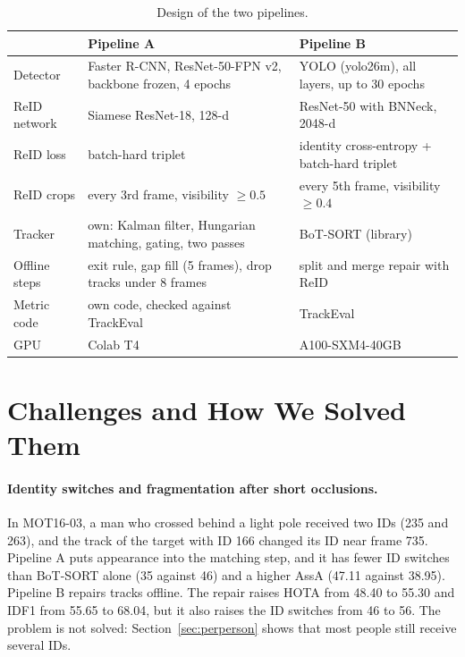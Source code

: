 \documentclass[11pt,letterpaper]{article}
\begin{document}
\begin{table}[h]
\centering\small
\caption{Design of the two pipelines.}\label{tab:design}
\begin{tabular}{p{2.6cm}p{6.1cm}p{6.1cm}}
\toprule
 & Pipeline A & Pipeline B \\
\midrule
Detector & Faster R-CNN, ResNet-50-FPN v2, backbone frozen, 4 epochs & YOLO (yolo26m), all layers, up to 30 epochs \\
ReID network & Siamese ResNet-18, 128-d & ResNet-50 with BNNeck, 2048-d \\
ReID loss & batch-hard triplet & identity cross-entropy + batch-hard triplet \\
ReID crops & every 3rd frame, visibility $\geq 0.5$ & every 5th frame, visibility $\geq 0.4$ \\
Tracker & own: Kalman filter, Hungarian matching, gating, two passes & BoT-SORT (library) \\
Offline steps & exit rule, gap fill (5 frames), drop tracks under 8 frames & split and merge repair with ReID \\
Metric code & own code, checked against TrackEval & TrackEval \\
GPU & Colab T4 & A100-SXM4-40GB \\
\bottomrule
\end{tabular}
\end{table}

\section{Challenges and How We Solved Them}\label{sec:challenges}

\paragraph{Identity switches and fragmentation after short occlusions.}
In MOT16-03, a man who crossed behind a light pole received two IDs (235 and 263), and the track of the target with ID 166 changed its ID near frame 735.
Pipeline A puts appearance into the matching step, and it has fewer ID switches than BoT-SORT alone (35 against 46) and a higher AssA (47.11 against 38.95).
Pipeline B repairs tracks offline.
The repair raises HOTA from 48.40 to 55.30 and IDF1 from 55.65 to 68.04, but it also raises the ID switches from 46 to 56.
The problem is not solved: Section~\ref{sec:perperson} shows that most people still receive several IDs.
\end{document}
